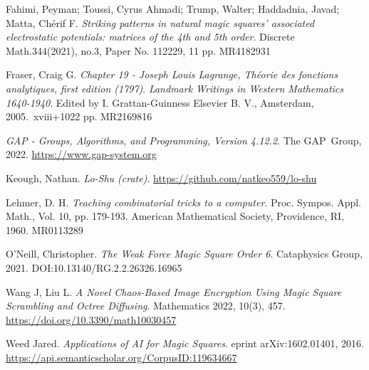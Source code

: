 \documentclass{rhumj_new}
\begin{document}
\begin{thebibliography}{10}
  Fahimi, Peyman; Toussi, Cyrus Ahmadi; Trump, Walter; Haddadnia, Javad; Matta, Chérif F. 
      {\it Striking patterns in natural magic squares' associated electrostatic potentials: 
      matrices of the 4th and 5th order}.
  Discrete Math.344(2021), no.3, Paper No. 112229, 11 pp. 
  MR4182931

    Fraser, Craig G.
    {\it Chapter 19 - Joseph Louis Lagrange, Théorie des fonctions analytiques, first edition (1797)}.
    {\it Landmark Writings in Western Mathematics 1640-1940}.
    Edited by I. Grattan-Guinness Elsevier B. V., Amsterdam, 2005.\ xviii+1022 pp.
    MR2169816

    {\it GAP - Groups, Algorithms, and Programming, Version 4.12.2}.
    The GAP~Group, 2022.
    \url{https://www.gap-system.org}

    Keough, Nathan.
    {\it Lo-Shu (crate)}.
    \url{https://github.com/natkeo559/lo-shu}

    Lehmer, D. H.
    {\it Teaching combinatorial tricks to a computer}.
    Proc. Sympos. Appl. Math., Vol. 10, pp. 179-193.
    American Mathematical Society, Providence, RI, 1960.
    MR0113289

    O'Neill, Christopher.
    {\it The Weak Force Magic Square Order 6}.
    Cataphysics Group, 2021.
    DOI:10.13140/RG.2.2.26326.16965

    Wang J, Liu L.
    {\it A Novel Chaos-Based Image Encryption Using Magic Square Scrambling and Octree Diffusing}.
    Mathematics 2022, 10(3), 457.
    \url{https://doi.org/10.3390/math10030457}

    Weed Jared.
    {\it Applications of AI for Magic Squares}.
    eprint arXiv:1602.01401, 2016.
    \url{https://api.semanticscholar.org/CorpusID:119634667}

\end{thebibliography}
\end{document}
